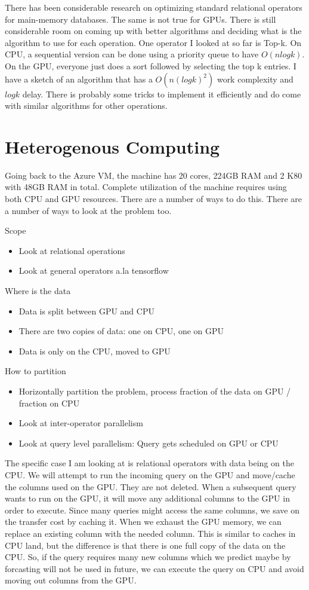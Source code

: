 \documentclass[11pt,twoside,a4paper]{article}
\begin{document}
There has been considerable research on optimizing standard relational operators
for main-memory databases. The same is not true for GPUs. There is still
considerable room on coming up with better algorithms and deciding what is the
algorithm to use for each operation. One operator I looked at so far is Top-k. 
On CPU, a sequential version can be done using a priority queue to have
$O(n logk)$. On the GPU, everyone just does a sort followed by selecting the top k
entries. I have a sketch of an algorithm that has a $O(n (log k)^2)$ work
complexity and $log k$ delay. There is probably some tricks to implement it
efficiently and do come with similar algorithms for other operations.

\section{Heterogenous Computing}

Going back to the Azure VM, the machine has 20 cores, 224GB RAM and 2 K80 with
48GB RAM in total. Complete utilization of the machine requires using both CPU
and GPU resources. There are a number of ways to do this. There are a number of
ways to look at the problem too.

Scope
\begin{itemize}
\item Look at relational operations
\item Look at general operators a.la tensorflow
\end{itemize}

Where is the data
\begin{itemize}
\item Data is split between GPU and CPU
\item There are two copies of data: one on CPU, one on GPU
\item Data is only on the CPU, moved to GPU
\end{itemize}

How to partition
\begin{itemize}
\item Horizontally partition the problem, process fraction of the data on GPU /
fraction on CPU
\item Look at inter-operator parallelism
\item Look at query level parallelism: Query gets scheduled on GPU or CPU
\end{itemize}

The specific case I am looking at is relational operators with data being on the
CPU. We will attempt to run the incoming query on the GPU and move/cache the
columns used on the GPU. They are not deleted. When a subsequent query wants to
run on the GPU, it will move any additional columns to the GPU in order to
execute. Since many queries might access the same columns, we save on the
transfer cost by caching it. When we exhaust the GPU memory, we can replace an
existing column with the needed column. This is similar to caches in CPU land,
but the difference is that there is one full copy of the data on the CPU. So, if
the query requires many new columns which we predict maybe by forcasting will
not be used in future, we can execute the query on CPU and avoid moving out
columns from the GPU.
\end{document}
